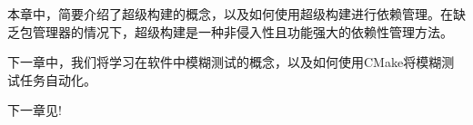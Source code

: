 本章中，简要介绍了超级构建的概念，以及如何使用超级构建进行依赖管理。在缺乏包管理器的情况下，超级构建是一种非侵入性且功能强大的依赖性管理方法。

下一章中，我们将学习在软件中模糊测试的概念，以及如何使用CMake将模糊测试任务自动化。

下一章见!